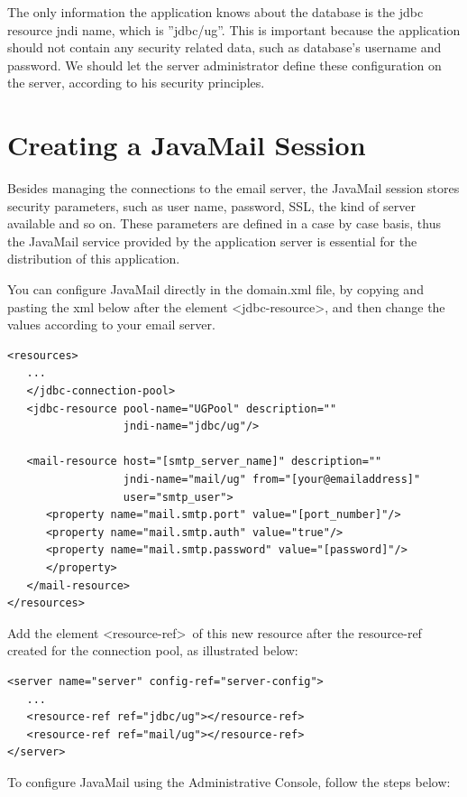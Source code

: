 \documentclass[envcountsame,envcountchap]{svmono}
\begin{document}
The only information the application knows about the database is the jdbc resource jndi name, which is ''jdbc/ug''. This is important because the application should not contain any security related data, such as database's username and password. We should let the server administrator define these configuration on the server, according to his security principles.

\section{Creating a JavaMail Session}

Besides managing the connections to the email server, the JavaMail session stores security parameters, such as user name, password, SSL, the kind of server available and so on. These parameters are defined in a case by case basis, thus the JavaMail service provided by the application server is essential for the distribution of this application.

You can configure JavaMail directly in the domain.xml file, by copying and pasting the xml below after the element \textless jdbc-resource\textgreater, and then change the values according to your email server.

\begin{verbatim}
<resources>
   ...
   </jdbc-connection-pool>
   <jdbc-resource pool-name="UGPool" description="" 
                  jndi-name="jdbc/ug"/>

   <mail-resource host="[smtp_server_name]" description="" 
                  jndi-name="mail/ug" from="[your@emailaddress]"
                  user="smtp_user">
      <property name="mail.smtp.port" value="[port_number]"/>
      <property name="mail.smtp.auth" value="true"/>
      <property name="mail.smtp.password" value="[password]"/>
      </property>
   </mail-resource>
</resources>
\end{verbatim}

Add the element \textless resource-ref\textgreater \ of this new resource after the resource-ref created for the connection pool, as illustrated below:

\begin{verbatim}
<server name="server" config-ref="server-config">
   ...
   <resource-ref ref="jdbc/ug"></resource-ref>
   <resource-ref ref="mail/ug"></resource-ref>
</server>
\end{verbatim}

To configure JavaMail using the Administrative Console, follow the steps below:
\end{document}
